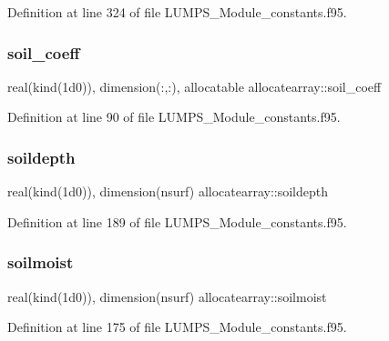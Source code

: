 Definition at line 324 of file L\+U\+M\+P\+S\+\_\+\+Module\+\_\+constants.\+f95.

\mbox{\label{namespaceallocatearray_a61ef42dc2ae8e0b11fe76576d463f176}} 
\subsubsection{\texorpdfstring{soil\+\_\+coeff}{soil\_coeff}}
{\footnotesize\ttfamily real(kind(1d0)), dimension(\+:,\+:), allocatable allocatearray\+::soil\+\_\+coeff}



Definition at line 90 of file L\+U\+M\+P\+S\+\_\+\+Module\+\_\+constants.\+f95.

\mbox{\label{namespaceallocatearray_a243033c7c16c825a30417c6bd4ea9f4e}} 
\subsubsection{\texorpdfstring{soildepth}{soildepth}}
{\footnotesize\ttfamily real(kind(1d0)), dimension(nsurf) allocatearray\+::soildepth}



Definition at line 189 of file L\+U\+M\+P\+S\+\_\+\+Module\+\_\+constants.\+f95.

\mbox{\label{namespaceallocatearray_ae688a4f5497c961baf9c8eecae674ec4}} 
\subsubsection{\texorpdfstring{soilmoist}{soilmoist}}
{\footnotesize\ttfamily real(kind(1d0)), dimension(nsurf) allocatearray\+::soilmoist}



Definition at line 175 of file L\+U\+M\+P\+S\+\_\+\+Module\+\_\+constants.\+f95.

\mbox{\label{namespaceallocatearray_a21359b000cf1cea64f86412e4336b957}} 
